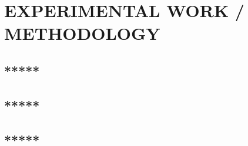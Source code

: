 	\chapter{EXPERIMENTAL WORK / METHODOLOGY}
	\label{chap:work}
	
	\section{*****}
	\section{*****}
	\section{*****}